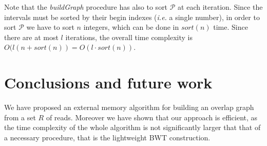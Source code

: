 \documentclass[runningheads,envcountsame,a4paper]{llncs}
\newcommand{\ie}{\textit{i.e.}\xspace}
\begin{document}
Note that the \emph{buildGraph} procedure has also to
sort $\mathcal{P}$ at each iteration.
Since the intervals must be sorted by their begin indexes (\ie a
single number), in order to sort  $\mathcal{P}$ we have to sort $n$ integers,
which can be done in $sort(n)$ time.
%
Since there are at most $l$ iterations, the overall time complexity is
$O(l (n + sort(n))=O(l \cdot sort(n))$.



\section{Conclusions and future work}
%

We have  proposed an external memory algorithm for building an overlap  graph from a set $R$ of reads.
Moreover we have shown that our approach is efficient, as the time complexity of
the whole algorithm is not significantly larger that that of a necessary
procedure, that is the lightweight BWT construction.
\end{document}
